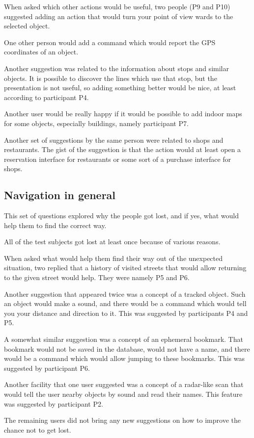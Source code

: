 \documentclass[nolof,digital]{fithesis3}
\begin{document}
When asked which other actions would be useful, two people (P9 and P10) suggested adding an action that would turn your point of view wards to the selected object.

One other person would add a command which would report the GPS coordinates of an object.

Another suggestion was related to the information about stops and similar objects. It is possible to discover the lines which use that stop, but the presentation is not useful, so adding something better would be nice, at least according to participant P4.

Another user would be really happy if it would be possible to add indoor maps for some objects, especially buildings, namely participant P7.

Another set of suggestions by the same person were related to shops and restaurants. The gist of the suggestion is that the action would at least open a reservation interface for restaurants or some sort of a purchase interface for shops.
\subsection{Navigation in general}
This set of questions explored why the people got lost, and if yes, what would help them to find the correct way.

All of the test subjects got lost at least once because of various reasons.

When asked what would help them find their way out of the unexpected situation, two replied that a history of visited streets that would allow returning to the given street would help. They were namely P5 and P6.

Another suggestion that appeared twice was a concept of a tracked object. Such an object would make a sound, and there would be a command which would tell you your distance and direction to it. This was suggested by participants P4 and P5.

A somewhat similar suggestion was a concept of an ephemeral bookmark. That bookmark would not be saved in the database, would not have a name, and there would be a command which would allow jumping to these bookmarks. This was suggested by participant P6.

Another facility that one user suggested was a concept of a radar-like scan that would tell the user nearby objects by sound and read their names. This feature was suggested by participant P2.

The remaining users did not bring any new suggestions on how to improve the chance not to get lost.
\end{document}
